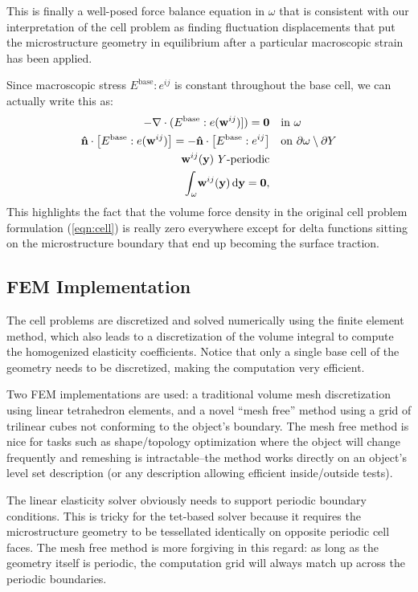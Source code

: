 \documentclass[10pt]{article}
\begin{document}
This is finally a well-posed force balance equation in $\omega$ that is
consistent with our interpretation of the cell problem as finding fluctuation
displacements that put the microstructure geometry in equilibrium after a
particular macroscopic strain has been applied.

Since macroscopic stress $E^\text{base} : e^{ij}$ is constant throughout the
base cell, we can actually write this as:
\begin{align*}
     -\nabla \cdot (E^\text{base} : e({\bf w}^{ij})]) = {\bf 0} & \quad \text{in } \omega \\
{\bf \hat n} \cdot \left[ E^\text{base} : e({\bf w}^{ij}) \right]  =  -{\bf \hat{n}} \cdot \left[ E^\text{base} : e^{ij} \right]& \quad \text{on } \partial \omega \setminus \partial Y \\
    {\bf w}^{ij}({\bf y})\ Y \text{-periodic} & \\
    \int_\omega \! {\bf w}^{ij}({\bf y})  \, \mathrm{d} {\bf y} =  {\bf 0}, 
\end{align*}
This highlights the fact that the volume force density in the original cell
problem formulation (\ref{eqn:cell}) is really zero everywhere except for delta
functions sitting on the microstructure boundary that end up becoming the
surface traction.

\subsection{FEM Implementation}
The cell problems are discretized and solved numerically using the finite
element method, which also leads to a discretization of the volume integral
to compute the homogenized elasticity coefficients. Notice that only a
single base cell of the geometry needs to be discretized, making the
computation very efficient.

Two FEM implementations are used: a traditional volume mesh discretization using
linear tetrahedron elements, and a novel ``mesh free'' method using a grid of
trilinear cubes not conforming to the object's boundary. The mesh free method is
nice for tasks such as shape/topology optimization where the object will change
frequently and remeshing is intractable--the method works directly on an
object's level set description (or any description allowing efficient
inside/outside tests).

The linear elasticity solver obviously needs to support periodic boundary
conditions. This is tricky for the tet-based solver because it requires the
microstructure geometry to be tessellated identically on opposite periodic cell
faces. The mesh free method is more forgiving in this regard: as long as the
geometry itself is periodic, the computation grid will always match up across
the periodic boundaries.
\end{document}
